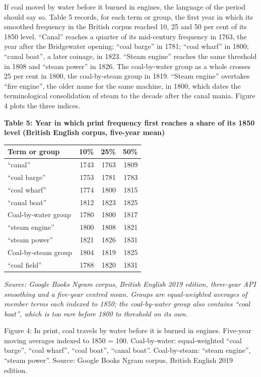 \documentclass[
  11pt,
]{article}
\newcounter{none} %
\begin{document}
If coal moved by water before it burned in engines, the language of the
period should say so. Table 5 records, for each term or group, the first
year in which its smoothed frequency in the British corpus reached 10,
25 and 50 per cent of its 1850 level. ``Canal'' reaches a quarter of its
mid-century frequency in 1763, the year after the Bridgewater opening;
``coal barge'' in 1781; ``coal wharf'' in 1800; ``canal boat'', a later
coinage, in 1823. ``Steam engine'' reaches the same threshold in 1808
and ``steam power'' in 1826. The coal-by-water group as a whole crosses
25 per cent in 1800, the coal-by-steam group in 1819. ``Steam engine''
overtakes ``fire engine'', the older name for the same machine, in 1800,
which dates the terminological consolidation of steam to the decade
after the canal mania. Figure 4 plots the three indices.

\textbf{Table 5: Year in which print frequency first reaches a share of
its 1850 level (British English corpus, five-year mean)}

{\def\LTcaptype{none} %
\begin{longtable}[]{@{}lrrr@{}}
\toprule\noalign{}
Term or group & 10\% & 25\% & 50\% \\
\midrule\noalign{}
\endhead
\bottomrule\noalign{}
\endlastfoot
``canal'' & 1743 & 1763 & 1809 \\
``coal barge'' & 1753 & 1781 & 1783 \\
``coal wharf'' & 1774 & 1800 & 1815 \\
``canal boat'' & 1812 & 1823 & 1825 \\
Coal-by-water group & 1780 & 1800 & 1817 \\
``steam engine'' & 1800 & 1808 & 1821 \\
``steam power'' & 1821 & 1826 & 1831 \\
Coal-by-steam group & 1804 & 1819 & 1825 \\
``coal field'' & 1788 & 1820 & 1831 \\
\end{longtable}
}

\emph{Source: Google Books Ngram corpus, British English 2019 edition,
three-year API smoothing and a five-year centred mean. Groups are
equal-weighted averages of member terms each indexed to 1850; the
coal-by-water group also contains ``coal boat'', which is too rare
before 1800 to threshold on its own.}

Figure 4: In print, coal travels by water before it is burned in
engines. Five-year moving averages indexed to 1850 = 100. Coal-by-water:
equal-weighted ``coal barge'', ``coal wharf'', ``coal boat'', ``canal
boat''. Coal-by-steam: ``steam engine'', ``steam power''. Source: Google
Books Ngram corpus, British English 2019 edition.
\end{document}

